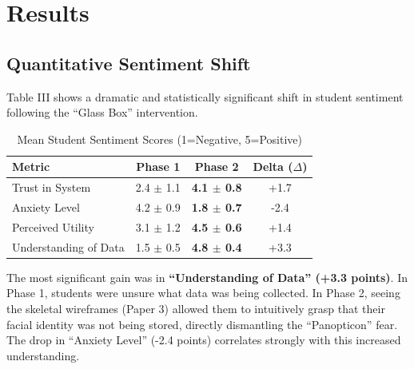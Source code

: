 \documentclass[conference]{IEEEtran}
\begin{document}
\section{Results}

\subsection{Quantitative Sentiment Shift}
Table III shows a dramatic and statistically significant shift in student sentiment following the ``Glass Box'' intervention.

\begin{table}[htbp]
\caption{Mean Student Sentiment Scores (1=Negative, 5=Positive)}
\begin{center}
\begin{tabular}{lccc}
\toprule
\textbf{Metric} & \textbf{Phase 1} & \textbf{Phase 2} & \textbf{Delta ($\Delta$)} \\
\midrule
Trust in System & 2.4 $\pm$ 1.1 & \textbf{4.1 $\pm$ 0.8} & +1.7 \\
Anxiety Level & 4.2 $\pm$ 0.9 & \textbf{1.8 $\pm$ 0.7} & -2.4 \\
Perceived Utility & 3.1 $\pm$ 1.2 & \textbf{4.5 $\pm$ 0.6} & +1.4 \\
Understanding of Data & 1.5 $\pm$ 0.5 & \textbf{4.8 $\pm$ 0.4} & +3.3 \\
\bottomrule
\end{tabular}
\end{center}
\label{tab:results}
\end{table}

The most significant gain was in \textbf{``Understanding of Data'' (+3.3 points)}. In Phase 1, students were unsure what data was being collected. In Phase 2, seeing the skeletal wireframes (Paper 3) allowed them to intuitively grasp that their facial identity was not being stored, directly dismantling the ``Panopticon'' fear. The drop in ``Anxiety Level'' (-2.4 points) correlates strongly with this increased understanding.
\end{document}
